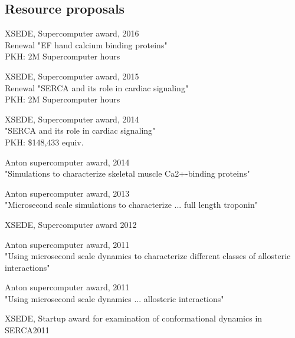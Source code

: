 \subsection{Resource proposals}
XSEDE, Supercomputer award, \dapi \hfill 2016\\
Renewal "EF hand calcium binding proteins" \\
PKH: 2M Supercomputer hours

XSEDE, Supercomputer award, \dapi \hfill 2015\\
Renewal "SERCA and its role in cardiac signaling" \\
PKH: 2M Supercomputer hours

XSEDE, Supercomputer award, \dapi \hfill 2014\\
"SERCA and its role in cardiac signaling" \\
PKH: \$148,433 equiv.  


Anton supercomputer award, \dacoi \hfill 2014\\
"Simulations to characterize skeletal muscle Ca2+-binding proteins" 

Anton supercomputer award, \dacoi \hfill 2013 \\
"Microsecond scale simulations to characterize ... full length troponin"

XSEDE, Supercomputer award \dacoi \hfill 2012 

Anton supercomputer award,  \hfill 2011 \\
"Using microsecond scale dynamics to characterize different classes of allosteric interactions" 

Anton supercomputer award,  \dacoi \hfill 2011 \\
"Using microsecond scale dynamics ...  allosteric interactions"

XSEDE,  Startup award for examination of conformational dynamics in SERCA\dapi \hfill 2011 